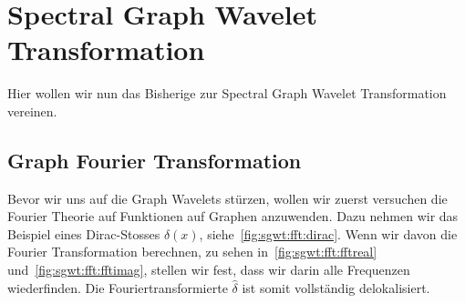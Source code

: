 
\section{Spectral Graph Wavelet Transformation\label{sec:sgwt:wavelets}}

Hier wollen wir nun das Bisherige zur Spectral Graph Wavelet Transformation 
vereinen.

\subsection{Graph Fourier Transformation\label{subsec:sgwt:gft}}

Bevor wir uns auf die Graph Wavelets st\"urzen, wollen wir zuerst versuchen die 
Fourier Theorie auf Funktionen auf Graphen anzuwenden. Dazu nehmen wir das 
Beispiel eines Dirac-Stosses $\delta(x)$, siehe~\cref{fig:sgwt:fft:dirac}.
Wenn wir davon die Fourier Transformation berechnen, zu sehen 
in~\cref{fig:sgwt:fft:fftreal} und~\cref{fig:sgwt:fft:fftimag}, stellen wir 
fest, dass wir darin alle Frequenzen wiederfinden. Die Fouriertransformierte 
$\hat{\delta}$ ist somit vollst\"andig delokalisiert.

